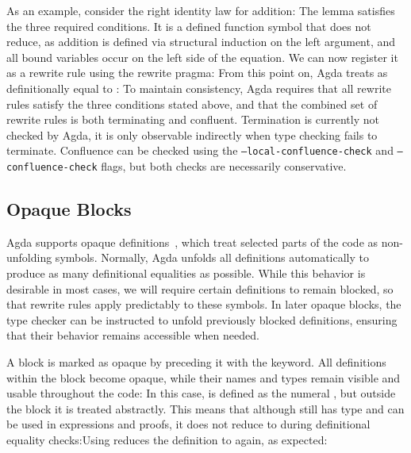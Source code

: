 \documentclass[screen,nonacm]{acmart}
\begin{document}
\noindent As an example, consider the right identity law for addition: \ERewrite{}The
lemma satisfies the three required conditions. It is a defined function symbol
that does not reduce, as addition is defined via structural induction on the
left argument, and all bound variables occur on the left side of the equation. We
can now register it as a rewrite rule using the rewrite pragma:
\ERewriteIt{}From this point on, Agda treats  \AgdaFunction{+}
 as definitionally equal to : \ERewriteEx{}To
maintain consistency, Agda requires that all rewrite rules satisfy the three
conditions stated above, and that the combined set of rewrite rules is both terminating
and confluent. Termination is currently not checked by Agda, it is only
observable indirectly when type checking fails to terminate. Confluence can be
checked using the \texttt{--local-confluence-check} and
\texttt{--confluence-check} flags, but both checks are necessarily
conservative.

\subsection*{Opaque Blocks}
Agda supports opaque definitions~\cite{gratzer2022controlling}, which treat
selected parts of the code as non-unfolding symbols. Normally, Agda unfolds all
definitions automatically to produce as many definitional equalities as
possible. While this behavior is desirable in most cases, we will require
certain definitions to remain blocked, so that rewrite rules apply predictably
to these symbols. In later opaque blocks, the type checker can be instructed to
unfold previously blocked definitions, ensuring that their behavior remains
accessible when needed.

A block is marked as opaque by preceding it with the 
keyword. All definitions within the block become opaque, while their names and
types remain visible and usable throughout the code: \EOpaque{}In this case,
 is defined as the numeral , but outside
the block it is treated abstractly. This means that although
 still has type  and can be used in
expressions and proofs, it does not reduce to  during
definitional equality checks:\EOpaqueExO{}Using  reduces
the definition to  again, as expected: \EOpaqueExT{}
\end{document}
